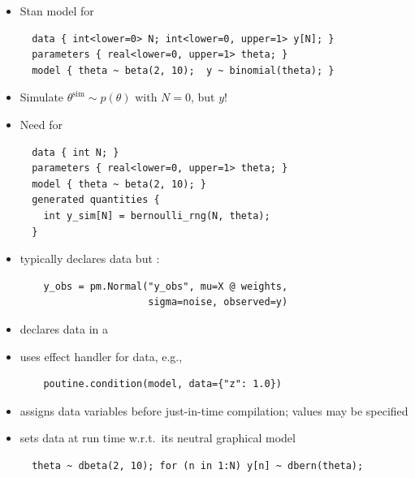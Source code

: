 \documentclass[10pt]{report}
\newcommand{\simvar}[1]{#1^{\textrm{sim}}}
\begin{document}
\begin{itemize}
\item Stan model for 
\vspace*{-6pt}
{\footnotesize
\begin{verbatim}
  data { int<lower=0> N; int<lower=0, upper=1> y[N]; }
  parameters { real<lower=0, upper=1> theta; }
  model { theta ~ beta(2, 10);  y ~ binomial(theta); }
\end{verbatim}
}
\item Simulate $\simvar{\theta} \sim p(\theta)$ with $N = 0$, but
   $y$!
\item Need  for 
\vspace*{-6pt}
{\footnotesize
\begin{verbatim}
  data { int N; }
  parameters { real<lower=0, upper=1> theta; }
  model { theta ~ beta(2, 10); }
  generated quantities { 
    int y_sim[N] = bernoulli_rng(N, theta);
  }
\end{verbatim}
}
\end{itemize}

\begin{itemize}
\item {} typically declares data but :
\vspace*{-6pt}
{\footnotesize 
\begin{verbatim}
    y_obs = pm.Normal("y_obs", mu=X @ weights, 
                      sigma=noise, observed=y) 
\end{verbatim}
\vspace*{-8pt}
}
\item {} declares data in a 
\item {} uses effect handler  for data, e.g., 
\vspace*{-6pt}
{\footnotesize 
\begin{verbatim}
    poutine.condition(model, data={"z": 1.0})
\end{verbatim}
\vspace*{-8pt}
}
\item {} assigns data variables before
  just-in-time compilation; values may be specified
\item {} sets data at run time w.r.t.\ its neutral graphical model
\vspace*{-12pt}
{\footnotesize 
\begin{verbatim}
  theta ~ dbeta(2, 10); for (n in 1:N) y[n] ~ dbern(theta); 
\end{verbatim}}
\end{itemize}
\end{document}
